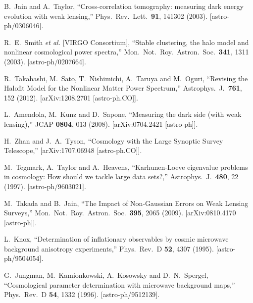 \documentclass[12pt]{article}
\begin{document}
\begin{thebibliography}{99}
B.~Jain and A.~Taylor,
  ``Cross-correlation tomography: measuring dark energy evolution with weak lensing,''
Phys.\ Rev.\ Lett.\  {\bf 91}, 141302 (2003).
[astro-ph/0306046].


  R.~E.~Smith {\it et al.} [VIRGO Consortium],
  ``Stable clustering, the halo model and nonlinear cosmological power spectra,''
Mon.\ Not.\ Roy.\ Astron.\ Soc.\  {\bf 341}, 1311 (2003).
[astro-ph/0207664].


  R.~Takahashi, M.~Sato, T.~Nishimichi, A.~Taruya and M.~Oguri,
  ``Revising the Halofit Model for the Nonlinear Matter Power Spectrum,''
Astrophys.\ J.\  {\bf 761}, 152 (2012).
[arXiv:1208.2701 [astro-ph.CO]].





  L.~Amendola, M.~Kunz and D.~Sapone,
  ``Measuring the dark side (with weak lensing),''
JCAP {\bf 0804}, 013 (2008).
[arXiv:0704.2421 [astro-ph]].
 
  H.~Zhan and J.~A.~Tyson,
  ``Cosmology with the Large Synoptic Survey Telescope,''
[arXiv:1707.06948 [astro-ph.CO]].
 
  
  M.~Tegmark, A.~Taylor and A.~Heavens,
  ``Karhunen-Loeve eigenvalue problems in cosmology: How should we tackle large data sets?,''
Astrophys.\ J.\  {\bf 480}, 22 (1997).
[astro-ph/9603021].
  
    
  
  M.~Takada and B.~Jain,
  ``The Impact of Non-Gaussian Errors on Weak Lensing Surveys,''
Mon.\ Not.\ Roy.\ Astron.\ Soc.\  {\bf 395}, 2065 (2009).
[arXiv:0810.4170 [astro-ph]].


  L.~Knox,
  ``Determination of inflationary observables by cosmic microwave background anisotropy experiments,''
Phys.\ Rev.\ D {\bf 52}, 4307 (1995).
[astro-ph/9504054].

  G.~Jungman, M.~Kamionkowski, A.~Kosowsky and D.~N.~Spergel,
  ``Cosmological parameter determination with microwave background maps,''
Phys.\ Rev.\ D {\bf 54}, 1332 (1996).
[astro-ph/9512139].




\end{thebibliography}
\end{document}
